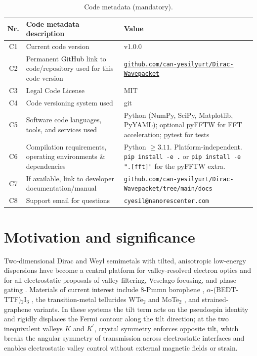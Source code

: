 \documentclass[preprint, 12pt, a4paper]{elsarticle}
\begin{document}
\begin{table}[!h]
\small
\begin{tabular}{|c|p{4.8cm}|p{6.8cm}|}
\hline
\textbf{Nr.} & \textbf{Code metadata description} & \textbf{Value} \\
\hline
C1 & Current code version & v1.0.0 \\
\hline
C2 & Permanent GitHub link to code/repository used for this code version &
    \href{https://github.com/can-yesilyurt/Dirac-Wavepacket}%
         {\nolinkurl{github.com/can-yesilyurt/Dirac-Wavepacket}} \\
\hline
C3 & Legal Code License & MIT \\
\hline
C4 & Code versioning system used & git \\
\hline
C5 & Software code languages, tools, and services used &
    Python (NumPy, SciPy, Matplotlib, PyYAML); optional pyFFTW for
    FFT acceleration; pytest for tests \\
\hline
C6 & Compilation requirements, operating environments \& dependencies &
    Python $\geq 3.11$. Platform-independent. \texttt{pip install -e .}
    or \texttt{pip install -e ".[fft]"} for the pyFFTW extra. \\
\hline
C7 & If available, link to developer documentation/manual &
    \nolinkurl{github.com/can-yesilyurt/Dirac-Wavepacket/tree/main/docs} \\
\hline
C8 & Support email for questions & \texttt{cyesil@nanorescenter.com} \\
\hline
\end{tabular}
\caption{Code metadata (mandatory).}
\label{tab:meta-code}
\end{table}

\section{Motivation and significance}
\label{sec:motivation}

Two-dimensional Dirac and Weyl semimetals with tilted, anisotropic
low-energy dispersions have become a central platform for
valley-resolved electron optics and for all-electrostatic proposals
of valley filtering, Veselago focusing, and phase gating
\cite{CastroNeto2009,Goerbig2008,Nguyen2018,Zhang2018}. Materials
of current interest include 8-Pmmn borophene
\cite{LopezBezanilla2016,Zabolotskiy2016},
$\alpha$-(BEDT-TTF)$_2$I$_3$ \cite{Goerbig2008}, the transition-metal
tellurides WTe$_2$ and MoTe$_2$ \cite{Soluyanov2015,Wang2019}, and
strained-graphene variants. In these systems the tilt term acts on
the pseudospin identity and rigidly displaces the Fermi contour along
the tilt direction; at the two inequivalent valleys $K$ and
$K^\prime$, crystal symmetry enforces opposite tilt, which breaks the
angular symmetry of transmission across electrostatic interfaces and
enables electrostatic valley control without external magnetic fields
or strain.
\end{document}
